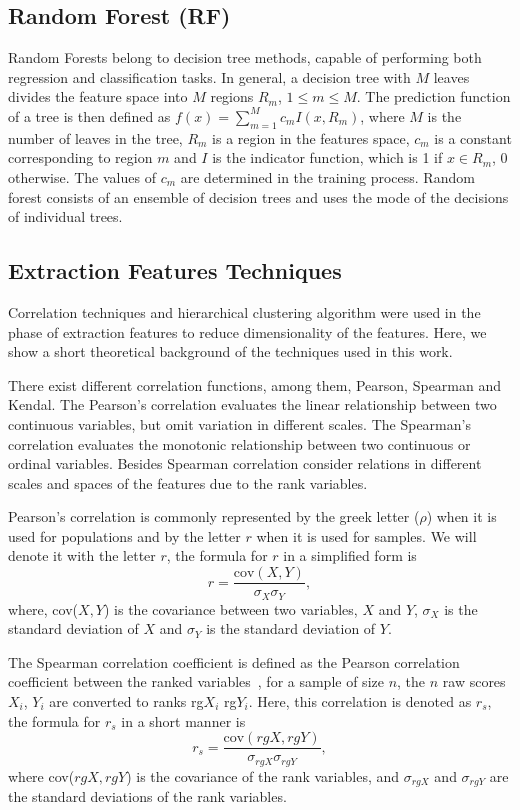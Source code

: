 \subsection{Random Forest (RF)}
Random Forests belong to decision tree methods, capable of performing both regression and classification tasks. In general, a decision tree with $M$ leaves divides the feature space into $M$ regions $R_m$, $1 \leq m \leq M$. The prediction function of a tree is then defined as $f(x) = \sum_{m=1}^{M} c_m I(x, R_m)$, where $M$ is the number of leaves in the tree, $R_m$ is a region in the features space, $c_m$ is a constant corresponding to region $m$ and $I$ is the indicator function, which is 1 if $x \in R_m$, 0 otherwise. The values of $c_m$ are determined in the training process. Random forest consists of an ensemble of decision trees and uses the mode of the decisions of individual trees.

\subsection{Extraction Features Techniques}\label{ssec:ML}

Correlation techniques and hierarchical clustering algorithm were used in the phase of extraction features to reduce dimensionality of the features. Here, we show a short theoretical background of the techniques used in this work. 

There exist different correlation functions, among them, Pearson, Spearman and Kendal. The Pearson's correlation evaluates the linear relationship between two continuous variables, but omit variation in different scales. The Spearman's correlation evaluates the monotonic relationship between two continuous or ordinal variables. Besides Spearman correlation consider relations in different scales and spaces of the features due to the rank variables.

Pearson's correlation is commonly represented by the greek letter ($\rho$) when it is used for populations and by the letter $r$ when it is used for samples. We will denote it with the letter $r$, the formula for $r$ in a simplified form is
\begin{equation}
r=\frac{\text{cov}(X,Y)}{\sigma_{X}\sigma_{Y}},
\end{equation}
where, cov($X,Y$) is the covariance between two variables, $X$ and $Y$, $\sigma_{X}$ is the standard deviation of $X$ and $\sigma _{Y}$ is the standard deviation of $Y$.

The Spearman correlation coefficient is defined as the Pearson correlation coefficient between the ranked variables~\citep{myers2010research}, for a sample of size $n$, the $n$ raw scores $X_{i}$, $Y_{i}$ are converted to ranks rg$X_{i}$ rg$Y_{i}$. Here, this correlation is denoted as $r_s$, the formula for $r_s$ in a short manner is
\begin{equation}
r_{s}=\frac{\text{cov}(rgX,rgY)}{\sigma_{rgX}\sigma_{rgY}},
\end{equation}
where cov($rgX,rgY$) is the covariance of the rank variables, and $\sigma_{rgX}$ and $\sigma_{rgY}$ are the standard deviations of the rank variables. 


